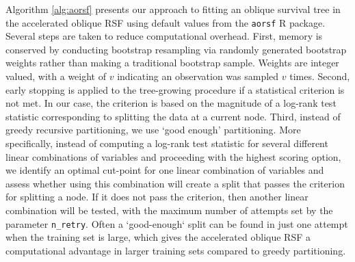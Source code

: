 \documentclass[twoside,11pt]{article}\usepackage[]{graphicx}\usepackage[]{xcolor}
\begin{document}
Algorithm \ref{alg:aorsf} presents our approach to fitting an oblique survival tree in the accelerated oblique RSF using default values from the \texttt{aorsf} R package. Several steps are taken to reduce computational overhead. First, memory is conserved by conducting bootstrap resampling via randomly generated bootstrap weights rather than making a traditional bootstrap sample. Weights are integer valued, with a weight of $v$ indicating an observation was sampled $v$ times. Second, early stopping is applied to the tree-growing procedure if a statistical criterion is not met. In our case, the criterion is based on the magnitude of a log-rank test statistic corresponding to splitting the data at a current node. Third, instead of greedy recursive partitioning, we use `good enough' partitioning. More specifically, instead of computing a log-rank test statistic for several different linear combinations of variables and proceeding with the highest scoring option, we identify an optimal cut-point for one linear combination of variables and assess whether using this combination will create a split that passes the criterion for splitting a node. If it does not pass the criterion, then another linear combination will be tested, with the maximum number of attempts set by the parameter \texttt{n\_retry}. Often a `good-enough` split can be found in just one attempt when the training set is large, which gives the accelerated oblique RSF a computational advantage in larger training sets compared to greedy partitioning.
\end{document}
